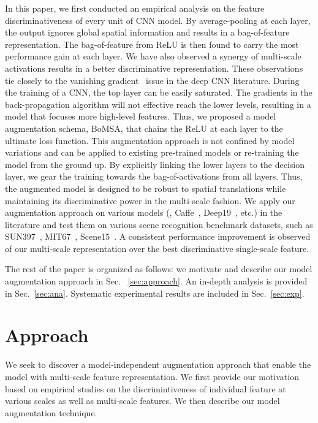 \documentclass[10pt,twocolumn,letterpaper]{article}
\begin{document}
In this paper, we first conducted an empirical analysis on the feature discriminativeness of every unit of CNN model. By average-pooling at each layer, the output ignores global spatial information and results in a bag-of-feature representation. The bag-of-feature from ReLU is then found to carry the most performance gain at each layer. We have also observed a synergy of multi-scale activations results in a better discriminative representation. These observations tie closely to the vanishing gradient~\cite{diff_cnn} issue in the deep CNN literature. During the training of a CNN, the top layer can be easily saturated. The gradients in the back-propagation algorithm will not effective reach the lower levels, resulting in a model that focuses more high-level features. Thus, we proposed a model augmentation schema, BoMSA, that chains the ReLU at each layer to the ultimate loss function. This augmentation approach is not confined by model variations and can be applied to existing pre-trained models or re-training the model from the ground up. By explicitly linking the lower layers to the decision layer, we gear the training towards the bag-of-activations from all layers. Thus, the augmented model is designed to be robust to spatial translations while maintaining its discriminative power in the multi-scale fashion. We apply our augmentation approach on various models (\eg, Caffe~\cite{Caffe}, Deep19~\cite{veryDeep}, etc.) in the literature and test them on various scene recognition benchmark datasets, such as SUN397~\cite{SUN397}, MIT67~\cite{MIT67}, Scene15~\cite{Scene15}. A consistent performance improvement is observed of our multi-scale representation over the best discriminative single-scale feature. 

The rest of the paper is organized as follows: we motivate and describe our model augmentation approach in Sec.~
\ref{sec:approach}. An in-depth analysis is provided in Sec.~\ref{sec:ana}. Systematic experimental results are included in Sec.~\ref{sec:exp}. 


\section{Approach\label{sec:approach}}

We seek to discover a model-independent augmentation approach that enable the model with multi-scale feature representation. We first provide our motivation based on empirical studies on the discrimintiveness of individual feature at various scales as well as multi-scale features. We then describe our model augmentation technique. 
\end{document}
